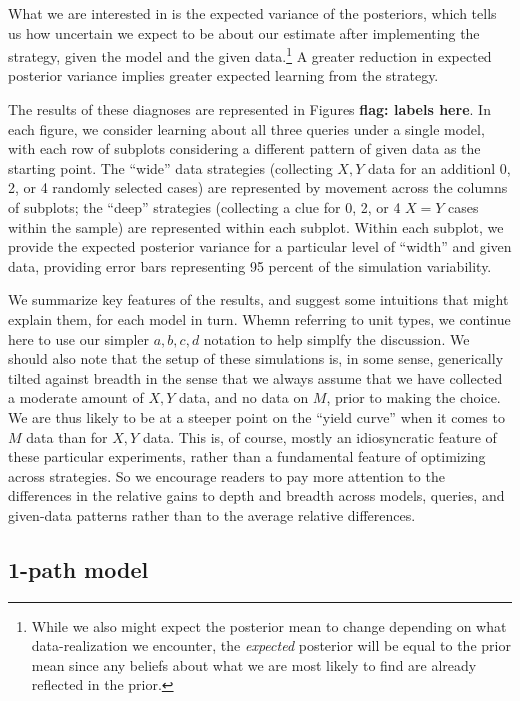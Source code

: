 \documentclass[
  12pt,
]{book}
\begin{document}
What we are interested in is the expected variance of the posteriors, which tells us how uncertain we expect to be about our estimate after implementing the strategy, given the model and the given data.\footnote{While we also might expect the posterior mean to change depending on what data-realization we encounter, the \emph{expected} posterior will be equal to the prior mean since any beliefs about what we are most likely to find are already reflected in the prior.} A greater reduction in expected posterior variance implies greater expected learning from the strategy.

The results of these diagnoses are represented in Figures \textbf{flag: labels here}. In each figure, we consider learning about all three queries under a single model, with each row of subplots considering a different pattern of given data as the starting point. The ``wide'' data strategies (collecting \(X, Y\) data for an additionl 0, 2, or 4 randomly selected cases) are represented by movement across the columns of subplots; the ``deep'' strategies (collecting a clue for 0, 2, or 4 \(X=Y\) cases within the sample) are represented within each subplot. Within each subplot, we provide the expected posterior variance for a particular level of ``width'' and given data, providing error bars representing 95 percent of the simulation variability.

We summarize key features of the results, and suggest some intuitions that might explain them, for each model in turn. Whemn referring to unit types, we continue here to use our simpler \(a, b, c, d\) notation to help simplfy the discussion. We should also note that the setup of these simulations is, in some sense, generically tilted against breadth in the sense that we always assume that we have collected a moderate amount of \(X, Y\) data, and no data on \(M\), prior to making the choice. We are thus likely to be at a steeper point on the ``yield curve'' when it comes to \(M\) data than for \(X, Y\) data. This is, of course, mostly an idiosyncratic feature of these particular experiments, rather than a fundamental feature of optimizing across strategies. So we encourage readers to pay more attention to the differences in the relative gains to depth and breadth across models, queries, and given-data patterns rather than to the average relative differences.

\hypertarget{path-model}{%
\subsection{1-path model}\label{path-model}}
\end{document}

